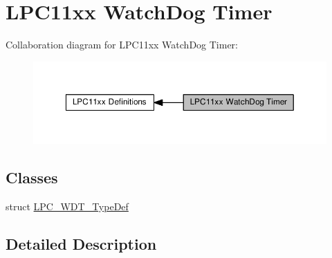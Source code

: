 \hypertarget{group___l_p_c11xx___w_d_t}{}\section{L\+P\+C11xx Watch\+Dog Timer}
\label{group___l_p_c11xx___w_d_t}
Collaboration diagram for L\+P\+C11xx Watch\+Dog Timer\+:\nopagebreak
\begin{figure}[H]
\begin{center}
\leavevmode
\includegraphics[width=350pt]{group___l_p_c11xx___w_d_t}
\end{center}
\end{figure}
\subsection*{Classes}
\begin{DoxyCompactItemize}
\item 
struct \hyperlink{struct_l_p_c___w_d_t___type_def}{L\+P\+C\+\_\+\+W\+D\+T\+\_\+\+Type\+Def}
\end{DoxyCompactItemize}


\subsection{Detailed Description}
